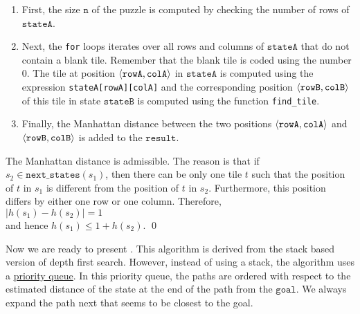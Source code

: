 \begin{enumerate}
      \begin{enumerate}
      \item First, the size $\texttt{n}$ of the puzzle is computed by checking the number of rows of
            $\texttt{stateA}$.
      \item Next, the \texttt{for} loops iterates over all rows and columns of $\texttt{stateA}$ that do not
            contain a blank tile.  Remember that the blank tile is coded using the number $0$.  The tile at
            position $\pair(\mathtt{rowA}, \mathtt{colA})$ in $\texttt{stateA}$ is computed using the expression \texttt{stateA[rowA][colA]} and the
            corresponding position $\pair(\mathtt{rowB}, \mathtt{colB})$ of this tile in state $\texttt{stateB}$ is computed using the function
            \texttt{find\_tile}.
      \item Finally, the Manhattan distance between the two positions $\pair(\mathtt{rowA}, \mathtt{colA})$ and
            $\pair(\mathtt{rowB}, \mathtt{colB})$ is added to the $\texttt{result}$.
      \end{enumerate}

    The Manhattan distance is admissible.  The reason is that if $s_2 \in \mathtt{next\_states}(s_1)$,
    then there can be only one tile $t$ such that the position of $t$ in $s_1$ is different from the position
    of $t$ in $s_2$.  Furthermore, this position differs by either one row or one column.  Therefore,
    \\[0.2cm]
    \hspace*{1.3cm}
    $|h(s_1) - h(s_2)| = 1$
    \\[0.2cm]
    and hence $h(s_1) \leq 1 + h(s_2)$.  \qed
\end{enumerate}
Now we are ready to present .  This algorithm is derived from the stack based
version of depth first search.  However, instead of using a stack, the algorithm uses a
\href{https://en.wikipedia.org/wiki/Priority_queue}{priority queue}.  In this priority queue, the paths are
ordered with respect to the estimated distance of the state at the end of the path from the $\texttt{goal}$.
We always expand the path next that seems to be closest to the goal.

